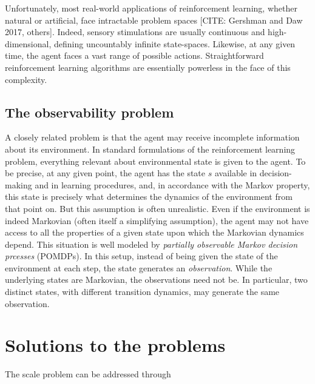 Unfortunately, most real-world applications of reinforcement learning, whether natural or artificial, face intractable problem spaces [CITE: Gershman and Daw 2017, others].
Indeed, sensory stimulations are usually continuous and high-dimensional, defining uncountably infinite state-spaces.
Likewise, at any given time, the agent faces a vast range of possible actions.
Straightforward reinforcement learning algorithms are essentially powerless in the face of this complexity.

\subsection{The observability problem}

A closely related problem is that the agent may receive incomplete information about its environment.
In standard formulations of the reinforcement learning problem, everything relevant about environmental state is given to the agent.
To be precise, at any given point, the agent has the state $s$ available in decision-making and in learning procedures, and, in accordance with the Markov property, this state is precisely what determines the dynamics of the environment from that point on.
But this assumption is often unrealistic.
Even if the environment is indeed Markovian (often itself a simplifying assumption), the agent may not have access to all the properties of a given state upon which the Markovian dynamics depend.
This situation is well modeled by \emph{partially observable Markov decision prcesses} (POMDPs).
In this setup, instead of being given the state of the environment at each step, the state generates an \emph{observation}.
While the underlying states are Markovian, the observations need not be.
In particular, two distinct states, with different transition dynamics, may generate the same observation.

\section{Solutions to the problems}

The scale problem can be addressed through

